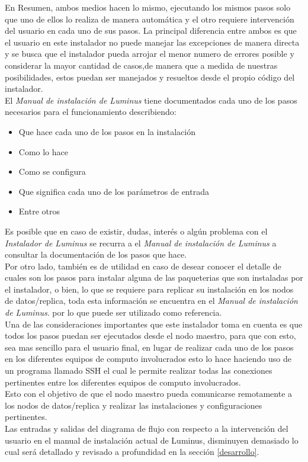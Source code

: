 En Resumen, ambos medios hacen lo mismo, ejecutando los mismos pasos solo que uno de ellos lo  realiza de manera automática y el otro requiere intervención del usuario en cada uno de sus pasos. La principal diferencia entre ambos es que el usuario en este instalador no puede manejar las excepciones de manera directa y se busca que el instalador pueda arrojar el menor numero de errores posible y considerar la mayor cantidad de casos,de manera que a medida de nuestras posibilidades, estos puedan ser manejados y resueltos desde el propio código del instalador.
\\
El \emph{Manual de instalación de Luminus} tiene documentados cada uno de los pasos necesarios para el funcionamiento describiendo:
\begin{itemize}
	\item Que hace cada uno de los pasos en la instalación
	\item Como lo hace
	\item Como se configura
	\item Que significa cada uno de los parámetros de entrada
	\item Entre otros
\end{itemize}
Es posible que en caso de existir, dudas, interés o algún problema con el \emph{Instalador de Luminus} se recurra a el \emph{Manual de instalación de Luminus} a consultar la documentación de los pasos que hace.
\\
Por otro lado, también es de utilidad en caso de desear conocer el detalle de cuales son los pasos para instalar alguna de las paqueterias que son instaladas por el instalador, o bien, lo que se requiere para replicar su instalación en los nodos de datos/replica, toda esta información se encuentra en el  \emph{Manual de instalación de Luminus}. por lo que puede ser utilizado como referencia.
\\
Una de las consideraciones importantes que este instalador toma en cuenta es que todos los pasos puedan ser ejecutados desde el nodo maestro, para que con esto, sea mas sencillo para el usuario final, en lugar de realizar cada uno de los pasos en los diferentes equipos de computo involucrados esto lo hace haciendo uso de un programa llamado SSH el cual le permite realizar todas las conexiones pertinentes entre los diferentes equipos de computo involucrados.
\\
Esto con el objetivo de que el nodo maestro pueda comunicarse remotamente a los nodos de datos/replica y realizar las instalaciones y configuraciones pertinentes.
\\
Las entradas y salidas del diagrama de flujo con respecto a la intervención del usuario en el manual de instalación actual de Luminus, disminuyen demasiado lo cual será detallado y revisado a profundidad en la sección \ref{desarrollo}.
\\
